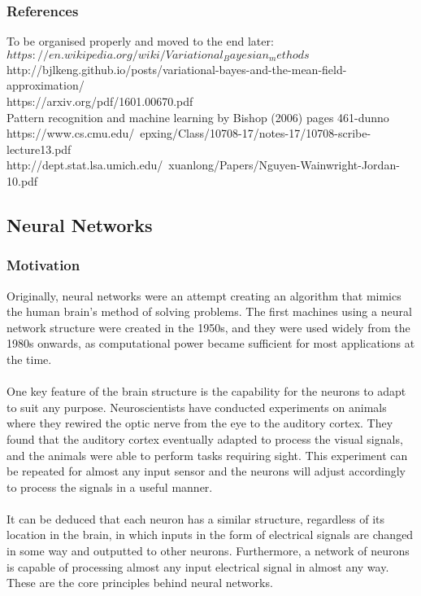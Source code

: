 \documentclass[a4paper,12pt]{article}
\numberwithin{equation}{section}
\begin{document}
\subsubsection{References}
To be organised properly and moved to the end later:\\
$https://en.wikipedia.org/wiki/Variational_Bayesian_methods$ \\
http://bjlkeng.github.io/posts/variational-bayes-and-the-mean-field-approximation/ \\
https://arxiv.org/pdf/1601.00670.pdf \\
Pattern recognition and machine learning by Bishop (2006) pages 461-dunno \\
https://www.cs.cmu.edu/~epxing/Class/10708-17/notes-17/10708-scribe-lecture13.pdf \\
http://dept.stat.lsa.umich.edu/~xuanlong/Papers/Nguyen-Wainwright-Jordan-10.pdf\\
\newpage
\subsection{Neural Networks}
\subsubsection{Motivation}
Originally, neural networks were an attempt creating an algorithm that mimics the human brain's method of solving problems. The first machines using a neural network structure were created in the 1950s, and they were used widely from the 1980s onwards, as computational power became sufficient for most applications at the time.\\
\\
One key feature of the brain structure is the capability for the neurons to adapt to suit any purpose. Neuroscientists have conducted experiments on animals where they rewired the optic nerve from the eye to the auditory cortex. They found that the auditory cortex eventually adapted to process the visual signals, and the animals were able to perform tasks requiring sight. This experiment can be repeated for almost any input sensor and the neurons will adjust accordingly to process the signals in a useful manner.\\
\\
It can be deduced that each neuron has a similar structure, regardless of its location in the brain, in which inputs in the form of electrical signals are changed in some way and outputted to other neurons. Furthermore, a network of neurons is capable of processing almost any input electrical signal in almost any way. These are the core principles behind neural networks.
\end{document}

